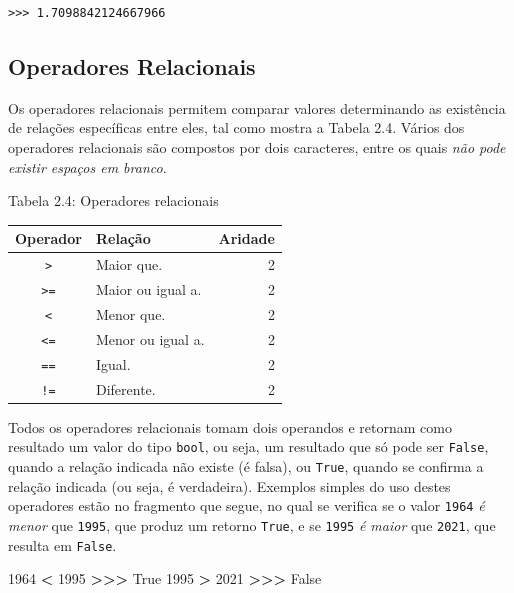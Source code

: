 \documentclass[
]{book}
\newenvironment{Shaded}{\begin{snugshade}}{\end{snugshade}}
\newcommand{\DecValTok}[1]{\textcolor[rgb]{0.00,0.00,0.81}{#1}}
\newcommand{\OperatorTok}[1]{\textcolor[rgb]{0.81,0.36,0.00}{\textbf{#1}}}
\newcommand{\VariableTok}[1]{\textcolor[rgb]{0.00,0.00,0.00}{#1}}
\begin{document}
\begin{verbatim}
>>> 1.7098842124667966
\end{verbatim}

\hypertarget{comput-opera-relac}{%
\subsection{Operadores Relacionais}\label{comput-opera-relac}}

Os operadores relacionais permitem comparar valores determinando as existência de relações específicas entre eles, tal como mostra a Tabela 2.4. Vários dos operadores relacionais são compostos por dois caracteres, entre os quais \emph{não pode existir espaços em branco}.

Tabela 2.4: Operadores relacionais

\begin{longtable}[]{@{}clr@{}}
\toprule
Operador & Relação & Aridade \\
\midrule
\endhead
\texttt{\textgreater{}} & Maior que. & 2 \\
\texttt{\textgreater{}=} & Maior ou igual a. & 2 \\
\texttt{\textless{}} & Menor que. & 2 \\
\texttt{\textless{}=} & Menor ou igual a. & 2 \\
\texttt{==} & Igual. & 2 \\
\texttt{!=} & Diferente. & 2 \\
\bottomrule
\end{longtable}

Todos os operadores relacionais tomam dois operandos e retornam como resultado um valor do tipo \texttt{bool}, ou seja, um resultado que só pode ser \texttt{False}, quando a relação indicada não existe (é falsa), ou \texttt{True}, quando se confirma a relação indicada (ou seja, é verdadeira). Exemplos simples do uso destes operadores estão no fragmento que segue, no qual se verifica se o valor \texttt{1964} \emph{é menor} que \texttt{1995}, que produz um retorno \texttt{True}, e se \texttt{1995} \emph{é maior} que \texttt{2021}, que resulta em \texttt{False}.

\begin{Shaded}
\begin{Highlighting}[]
\DecValTok{1964} \OperatorTok{\textless{}} \DecValTok{1995}
\OperatorTok{\textgreater{}\textgreater{}\textgreater{}} \VariableTok{True}
\DecValTok{1995} \OperatorTok{\textgreater{}} \DecValTok{2021}
\OperatorTok{\textgreater{}\textgreater{}\textgreater{}} \VariableTok{False}
\end{Highlighting}
\end{Shaded}
\end{document}
